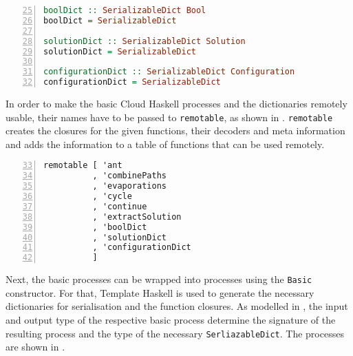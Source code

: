 \begin{lstlisting}[language=Haskell,frame=tb,numbers=left,label=lst:ant_dicts,caption=Dictionaries for data serialisation.,firstnumber=25]
boolDict :: SerializableDict Bool
boolDict = SerializableDict

solutionDict :: SerializableDict Solution
solutionDict = SerializableDict

configurationDict :: SerializableDict Configuration
configurationDict = SerializableDict
\end{lstlisting}

In order to make the basic \textsf{Cloud Haskell} processes and the dictionaries remotely usable, their names have to be passed to \texttt{remotable}, as shown in . \texttt{remotable} creates the closures for the given functions, their decoders and meta information and adds the information to a table of functions that can be used remotely.

\begin{lstlisting}[language=Haskell,frame=tb,numbers=left,firstnumber=33,label=lst:ant_remotable,caption=Making processes and dictionaries remotable.]
remotable [ 'ant
          , 'combinePaths
          , 'evaporations
          , 'cycle
          , 'continue
          , 'extractSolution
          , 'boolDict
          , 'solutionDict
          , 'configurationDict
          ]
\end{lstlisting}

Next, the basic processes can be wrapped into processes using the \texttt{Basic} constructor. For that, \textsf{Template Haskell} is used to generate the necessary dictionaries for serialisation and the function closures. As modelled in , the input and output type of the respective basic process determine the signature of the resulting process and the type of the necessary \texttt{SerliazableDict}. The processes are shown in .

